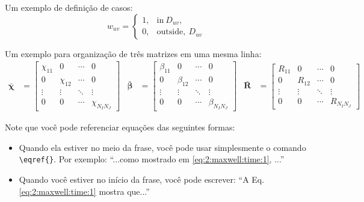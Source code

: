 	   Um exemplo de definição de casos:
	   \begin{equation}
		w_{uv} = \begin{cases}
						  1,& \mathrm{in} ~D_{uv}, \\
						  0,& \mathrm{outside}, ~D_{uv}
					  \end{cases} \label{eq:3:discretization:subdomain}
		\end{equation}

		Um exemplo para organização de três matrizes em uma mesma linha:
		\begin{align}
			\boldsymbol{\bar{\chi}} &=	\begin{bmatrix}
														 \chi_{11} & 0 & \cdots & 0 \\
														 0 & \chi_{12} & \cdots & 0 \\
														 \vdots & \vdots & \ddots & \vdots \\
														  0 & 0 & \cdots & \chi_{N_IN_J}
													 \end{bmatrix}
			&\boldsymbol{\bar{\beta}} &=	\begin{bmatrix}
																\beta_{11} & 0 & \cdots & 0 \\
																0 & \beta_{12} & \cdots & 0 \\
																\vdots & \vdots & \ddots & \vdots \\
																0 & 0 & \cdots & \beta_{N_IN_J}
															\end{bmatrix}
			&\mathbf{\bar{R}} &=	\begin{bmatrix}
													R_{11} & 0 & \cdots & 0 \\
													0 & R_{12} & \cdots & 0 \\
													\vdots & \vdots & \ddots & \vdots \\
													0 & 0 & \cdots & R_{N_IN_J}
												\end{bmatrix} \label{eq:3:discretization:collocation:18}
		\end{align}

		Note que você pode referenciar equações das seguintes formas:

		\begin{itemize}
			\item Quando ela estiver no meio da frase, você pode usar simplesmente o comando \verb|\eqref{}|. Por exemplo: ``...como mostrado em \eqref{eq:2:maxwell:time:1}, ...''
			\item Quando você estiver no início da frase, você pode escrever: ``A Eq. \eqref{eq:2:maxwell:time:1} mostra que...''
		\end{itemize}

